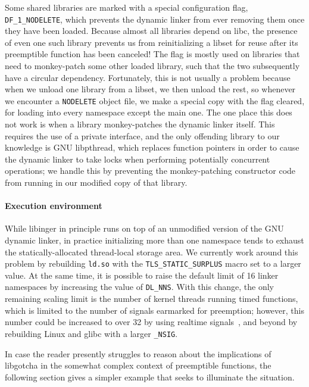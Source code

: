 Some shared libraries are marked with a special configuration flag,
\texttt{DF\_1\_NODELETE}, which prevents the dynamic linker from ever removing them
once they have been loaded.  Because almost all libraries depend on libc, the
presence of even one such library prevents us from reinitializing a libset for reuse
after its preemptible function has been canceled!  The flag is mostly used on
libraries that need
to monkey-patch some other loaded library, such that the two subsequently have a
circular dependency.  Fortunately, this is not usually a problem because when we
unload one library from a libset, we then unload the rest, so whenever we encounter a
\texttt{NODELETE} object file, we make a special copy with the flag cleared, for
loading into every namespace except the main one.  The one place this does not work
is when a library monkey-patches the dynamic linker itself.  This
requires the use of a private interface, and the only offending library to our
knowledge is GNU libpthread, which replaces function pointers in order to cause the
dynamic linker to take locks when performing potentially concurrent operations; we
handle this by preventing the monkey-patching constructor code from running in our
modified copy of that library.

\paragraph{Execution environment}

While libinger in principle runs on top of an unmodified version of the GNU dynamic
linker, in practice initializing more than one namespace tends to exhaust the
statically-allocated thread-local storage area.  We currently work around this
problem by rebuilding \texttt{ld.so} with the \texttt{TLS\_STATIC\_SURPLUS} macro set
to a larger value.  At the same time, it is possible to raise the default limit
of 16 linker namespaces by increasing the value of \texttt{DL\_NNS}.  With this
change, the only remaining scaling limit is the number of kernel threads running
timed functions, which is limited to the number of signals earmarked for preemption;
however, this number could be increased to over 32 by using realtime
signals~\cite{signal-manpage}, and beyond by rebuilding Linux and glibc with a larger
\texttt{\_NSIG}.

\vspace{\parsep}
In case the reader presently struggles to reason about the implications of libgotcha
in the somewhat complex context of preemptible functions, the following section gives
a simpler example that seeks to illuminate the situation.

